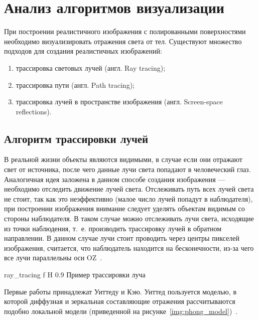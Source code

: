 \section{Анализ алгоритмов визуализации}




При построении реалистичного изображения с полированными поверхностями необходимо визуализировать отражения света от тел.
Существуют множество подходов для создания реалистичных изображений:
\begin{enumerate}
	\item трассировка световых лучей (англ. Ray tracing);
	\item трассировка пути (англ. Path  tracing);
	\item трассировка лучей в пространстве изображения (англ. Screen-space reflections).
\end{enumerate}





\subsection{Алгоритм трассировки лучей}
\label{sec:ray_tracing}
В реальной жизни объекты являются видимыми, в случае если они отражают свет от источника, после чего данные лучи света попадают в человеческий глаз. Аналогичная идея заложена в данном способе создания изображения --- необходимо отследить движение лучей света.
Отслеживать путь всех лучей света не стоит, так как это неэффективно (малое число лучей попадут в наблюдателя), при построении изображения внимание следует уделять объектам видимым со стороны наблюдателя.
В таком случае можно отслеживать лучи света, исходящие из точки наблюдения, т.~е. производить трассировку лучей в обратном направлении. В данном случае лучи стоит проводить через центры пикселей изображения,
считается, что наблюдатель находится на бесконечности, из-за чего все лучи параллельны оси OZ~\cite{Rodgers,modern_ray_tracing}.




{ray_tracing} %
{f} %
{H} %
{0.9\textwidth} %
{Пример трассировки луча} %






Первые работы принадлежат Уиттеду и Кэю.
Уиттед пользуется моделью, в которой диффузная и зеркальная составляющие отражения рассчитываются подобно локальной модели (приведенной на рисунке~\ref{img:phong_model})~\cite{Rodgers}.



